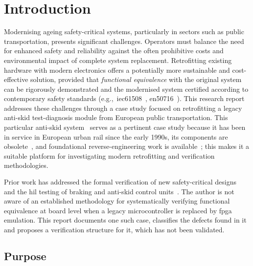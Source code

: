 \chapter{Introduction}
\label{chap:introduction}

Modernising ageing safety-critical systems, particularly in sectors such as public transportation, presents significant challenges. Operators must balance the need for enhanced safety and reliability against the often prohibitive costs and environmental impact of complete system replacement. Retrofitting existing hardware with modern electronics offers a potentially more sustainable and cost-effective solution, provided that \textit{functional equivalence} with the original system can be rigorously demonstrated and the modernised system certified according to contemporary safety standards (e.g.,~\gls{iec61508}~\cite{iec61508_2010}, \gls{en50716}~\cite{en50716_2023}). This research report addresses these challenges through a case study focused on retrofitting a legacy anti-skid test-diagnosis module from European public transportation. This particular anti-skid system~\cite{rexroth1992wsp} serves as a pertinent case study because it has been in service in European urban rail since the early 1990s, its components are obsolete~\cite{ayoub2014}, and foundational reverse-engineering work is available~\cite{ayoub2014, leyer2023}; this makes it a suitable platform for investigating modern retrofitting and verification methodologies.

Prior work has addressed the formal verification of new safety-critical designs~\cite{formal_verification_rail_2023, bozzano2016formal} and the \gls{hil} testing of braking and anti-skid control units~\cite{zhou_wu_2020}. The author is not aware of an established methodology for systematically verifying functional equivalence at board level when a legacy microcontroller is replaced by \gls{fpga} emulation. This report documents one such case, classifies the defects found in it and proposes a verification structure for it, which has not been validated.

\section{Purpose}
\label{sec:purpose}

